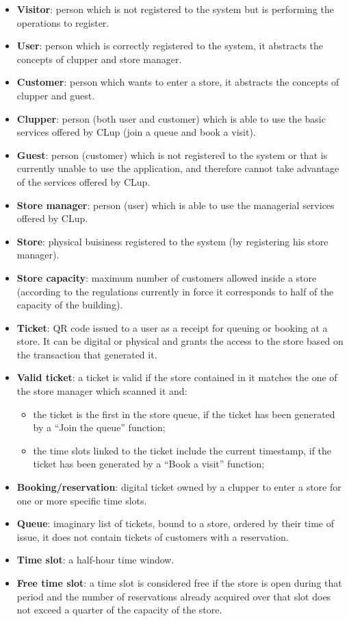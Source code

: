 \documentclass[
]{article}
\providecommand{\tightlist}{%
  \setlength{\itemsep}{0pt}\setlength{\parskip}{0pt}}
\begin{document}
\begin{itemize}
\tightlist
\item
  \textbf{Visitor}: person which is not registered to the system but is
  performing the operations to register.
\item
  \textbf{User}: person which is correctly registered to the system, it
  abstracts the concepts of clupper and store manager.
\item
  \textbf{Customer}: person which wants to enter a store, it abstracts
  the concepts of clupper and guest.
\item
  \textbf{Clupper}: person (both user and customer) which is able to use
  the basic services offered by CLup (join a queue and book a visit).
\item
  \textbf{Guest}: person (customer) which is not registered to the
  system or that is currently unable to use the application, and
  therefore cannot take advantage of the services offered by CLup.
\item
  \textbf{Store manager}: person (user) which is able to use the
  managerial services offered by CLup.
\item
  \textbf{Store}: physical buisiness registered to the system (by
  registering his store manager).
\item
  \textbf{Store capacity}: maximum number of customers allowed inside a
  store (according to the regulations currently in force it corresponds
  to half of the capacity of the building).
\item
  \textbf{Ticket}: QR code issued to a user as a receipt for queuing or
  booking at a store. It can be digital or physical and grants the
  access to the store based on the transaction that generated it.
\item
  \textbf{Valid ticket}: a ticket is valid if the store contained in it
  matches the one of the store manager which scanned it and:

  \begin{itemize}
  \tightlist
  \item
    the ticket is the first in the store queue, if the ticket has been
    generated by a ``Join the queue'' function;
  \item
    the time slots linked to the ticket include the current timestamp,
    if the ticket has been generated by a ``Book a visit'' function;
  \end{itemize}
\item
  \textbf{Booking/reservation}: digital ticket owned by a clupper to
  enter a store for one or more specific time slots.
\item
  \textbf{Queue}: imaginary list of tickets, bound to a store, ordered
  by their time of issue, it does not contain tickets of customers with
  a reservation.
\item
  \textbf{Time slot}: a half-hour time window.
\item
  \textbf{Free time slot}: a time slot is considered free if the store
  is open during that period and the number of reservations already
  acquired over that slot does not exceed a quarter of the capacity of
  the store.
\end{itemize}
\end{document}
